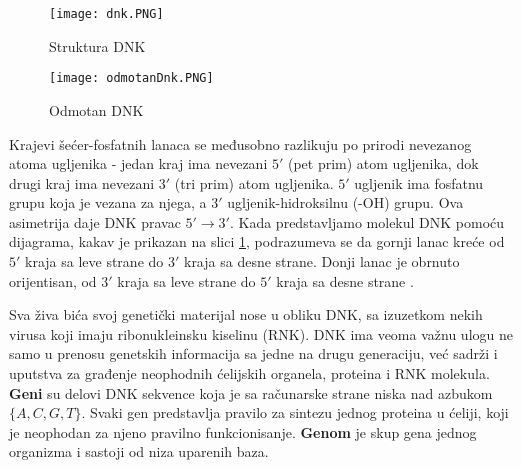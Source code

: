 \documentclass[12pt,oneside]{memoir}
\begin{document}
\begin{figure}[!ht]
  \centering
  \texttt{[image: dnk.PNG]}
  \caption{Struktura DNK \cite{DNA}}
  \label{fig:00}
\end{figure}

\begin{figure}[!ht]
  \centering
  \texttt{[image: odmotanDnk.PNG]}
  \caption{Odmotan DNK \cite{DNA2}}
  \label{fig:odmotanDnk}
\end{figure}

\begin{comment}
 Šećeri u DNK su međusobno povezani fosfatnim grupama koje stvaraju fosfodiestarsku vezu između trećeg i petog ugljenikovog atoma šećernog prstena. Fosfodiestarske veze su asimetrične, te DNK polinukleotidni lanci imaju smer. Kako ovi lanci idu u suprotnim smerovima, kaže se da je DNK antiparalelna. Asimetrični krajevi DNK baza se označavaju sa 5' (pet prim) i 3' (tri prim). Antiparalelnost znači da jedan lanac ide u smeru 5' \rightarrow 3', dok suprotni lanac ide u smeru 3' \rightarrow 5'. 

$5'$ i $3'$ označavaju brojeve ugljenika koji se nalaze u osnovi DNK šećera. $5'$ ugljenik ima fosfatnu grupu koja je vezana za njega, a $3'$ ugljenik-hidroksilnu (-OH) grupu. Ova asimetrija daje DNK pravac koji se obeležava sa $5' \rightarrow 3'$. Na primer, DNK polimeraza deluje u pravcu $5' \rightarrow 3'$, tj. dodaje nukleotide na $3'$ kraj molekula napredujući u tom smeru.

\end{comment}

Krajevi šećer-fosfatnih lanaca se međusobno razlikuju po prirodi nevezanog atoma ugljenika - jedan kraj ima nevezani $5'$ (pet prim) atom ugljenika, dok drugi kraj ima nevezani $3'$ (tri prim) atom ugljenika. $5'$ ugljenik ima fosfatnu grupu koja je vezana za njega, a $3'$ ugljenik-hidroksilnu (-OH) grupu. Ova asimetrija daje DNK pravac $5' \rightarrow 3'$. Kada predstavljamo molekul DNK pomoću dijagrama, kakav je prikazan na slici \ref{fig:00}, podrazumeva se da gornji lanac kreće od $5'$ kraja sa leve strane do $3'$ kraja sa desne strane. Donji lanac je obrnuto orijentisan, od $3'$ kraja sa leve strane do $5'$ kraja sa desne strane \cite{DNA2}. 

Sva živa bića svoj genetički materijal nose u obliku DNK, sa izuzetkom nekih virusa koji imaju ribonukleinsku kiselinu (RNK). DNK ima veoma važnu ulogu ne samo u prenosu genetskih informacija sa jedne na drugu generaciju, već sadrži i uputstva za građenje neophodnih ćelijskih organela, proteina i RNK molekula. \textbf{Geni} su delovi DNK sekvence koja je sa računarske strane niska nad azbukom $\{A, C, G, T\}$.  Svaki gen predstavlja pravilo za sintezu jednog proteina u ćeliji, koji je neophodan za njeno pravilno funkcionisanje. \textbf{Genom} je skup gena jednog organizma i sastoji od niza uparenih baza.
\end{document}
